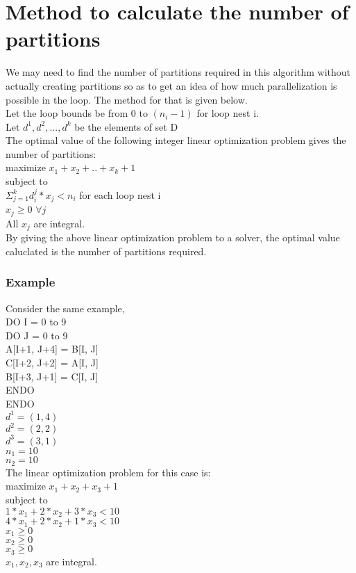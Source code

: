 \chapter{Method to calculate the number of partitions}
We may need to find the number of partitions required in this algorithm without actually creating partitions so as to get an idea of how much parallelization is possible in the loop.
The method for that is given below. \\

Let the loop bounds be from 0 to $(n_i - 1)$ for loop nest i. \\
Let $d^1, d^2, ... , d^k$ be the elements of set D \\

The optimal value of the following integer linear optimization problem gives the number of partitions: \\

\noindent maximize $x_1 + x_2 + .. + x_k + 1$ \\
subject to \\
\indent $ \Sigma_{j=1}^{k} d_{i}^{j} * x_j  < n_i$ for each loop nest i \\
\indent $ x_j \geq 0$  $\forall j$ \\
\indent All $x_j$ are integral. \\ 

By giving the above linear optimization problem to a solver, the optimal value caluclated is the number of partitions required.


\subsection{Example}
Consider the same example,  \\
DO I = 0 to 9 \\
\indent DO J = 0 to 9 \\
\indent \indent A[I+1, J+4] = B[I, J] \\
\indent \indent C[I+2, J+2] = A[I, J] \\
\indent \indent B[I+3, J+1] = C[I, J] \\
\indent ENDO \\
ENDO \\

\noindent $d^1 = (1, 4)$ \\
$d^2 = (2, 2)$ \\
$d^3 = (3, 1)$ \\
$n_1 = 10$ \\
$n_2 = 10$ \\

The linear optimization problem for this case is: \\
maximize $x_1 + x_2 + x_3 + 1$ \\
subject to \\
\indent $ 1 * x_1 + 2 * x_2 + 3 * x_3 < 10 $ \\
\indent $ 4 * x_1 + 2 * x_2 + 1 * x_3 < 10 $ \\
\indent $ x_1 \geq 0 $ \\
\indent $ x_2 \geq 0 $ \\
\indent $ x_3 \geq 0 $ \\
\indent $x_1, x_2, x_3$ are integral. \\